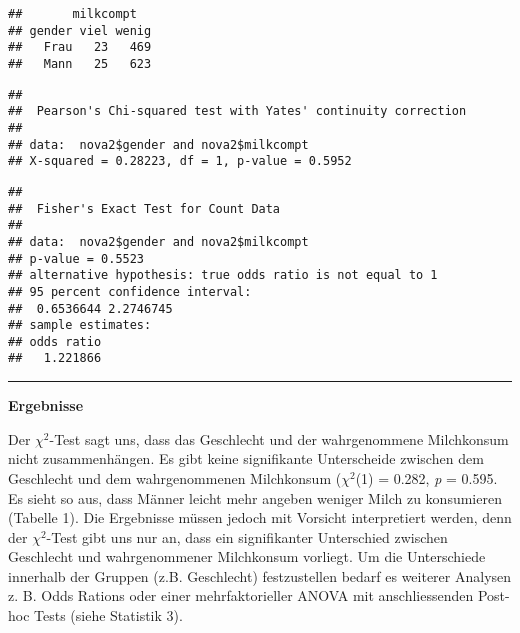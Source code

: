 \documentclass[
]{article}
\newenvironment{Shaded}{\begin{snugshade}}{\end{snugshade}}
\newcommand{\CommentTok}[1]{\textcolor[rgb]{0.56,0.35,0.01}{\textit{#1}}}
\newcommand{\KeywordTok}[1]{\textcolor[rgb]{0.13,0.29,0.53}{\textbf{#1}}}
\newcommand{\NormalTok}[1]{#1}
\newcommand{\OperatorTok}[1]{\textcolor[rgb]{0.81,0.36,0.00}{\textbf{#1}}}
\newcommand{\StringTok}[1]{\textcolor[rgb]{0.31,0.60,0.02}{#1}}
\begin{document}
\begin{verbatim}
##       milkcompt
## gender viel wenig
##   Frau   23   469
##   Mann   25   623
\end{verbatim}

\begin{Shaded}
\end{Shaded}

\begin{verbatim}
## 
##  Pearson's Chi-squared test with Yates' continuity correction
## 
## data:  nova2$gender and nova2$milkcompt
## X-squared = 0.28223, df = 1, p-value = 0.5952
\end{verbatim}

\begin{Shaded}
\end{Shaded}

\begin{verbatim}
## 
##  Fisher's Exact Test for Count Data
## 
## data:  nova2$gender and nova2$milkcompt
## p-value = 0.5523
## alternative hypothesis: true odds ratio is not equal to 1
## 95 percent confidence interval:
##  0.6536644 2.2746745
## sample estimates:
## odds ratio 
##   1.221866
\end{verbatim}

\begin{center}\rule{0.5\linewidth}{0.5pt}\end{center}

\textbf{Ergebnisse}

Der \(\chi^2\)-Test sagt uns, dass das Geschlecht und der wahrgenommene
Milchkonsum nicht zusammenhängen. Es gibt keine signifikante
Unterscheide zwischen dem Geschlecht und dem wahrgenommenen Milchkonsum
(\(\chi^2\)(1) = 0.282, \emph{p} = 0.595. Es sieht so aus, dass Männer
leicht mehr angeben weniger Milch zu konsumieren (Tabelle 1). Die
Ergebnisse müssen jedoch mit Vorsicht interpretiert werden, denn der
\(\chi^2\)-Test gibt uns nur an, dass ein signifikanter Unterschied
zwischen Geschlecht und wahrgenommener Milchkonsum vorliegt. Um die
Unterschiede innerhalb der Gruppen (z.B. Geschlecht) festzustellen
bedarf es weiterer Analysen z. B. Odds Rations oder einer
mehrfaktorieller ANOVA mit anschliessenden Post-hoc Tests (siehe
Statistik 3).
\end{document}
